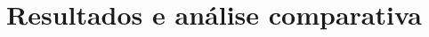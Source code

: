 \documentclass[12pt]{article}
\begin{document}
%
%
%
%
%
%
\section{Resultados e análise comparativa}

%
\end{document}

